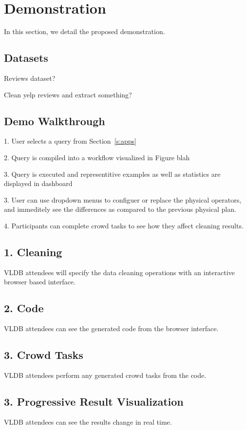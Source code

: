 \section{Demonstration}

In this section, we detail the proposed demonstration.

\subsection{Datasets}

Reviews dataset?

Clean yelp reviews and extract something?


\subsection{Demo Walkthrough}


1. User selects a query from Section~\ref{s:apps}

2. Query is compiled into a workflow visualized in Figure blah

3. Query is executed and representitive examples as well as statistics are
   displayed in dashboard

3. User can use dropdown menus to configuer or replace the physical operators,
   and immeditely see the differences as compared to the previous physical plan.

4. Participants can complete crowd tasks to see how they affect cleaning results.


\subsection{1. Cleaning}
VLDB attendees will specify the data cleaning operations with an interactive browser based
interface. 

\subsection{2. Code}
VLDB attendees can see the generated code from the browser interface.

\subsection{3. Crowd Tasks}
VLDB attendees perform any generated crowd tasks from the code.  

\subsection{3. Progressive Result Visualization}
VLDB attendees can see the results change in real time.  
\fi
